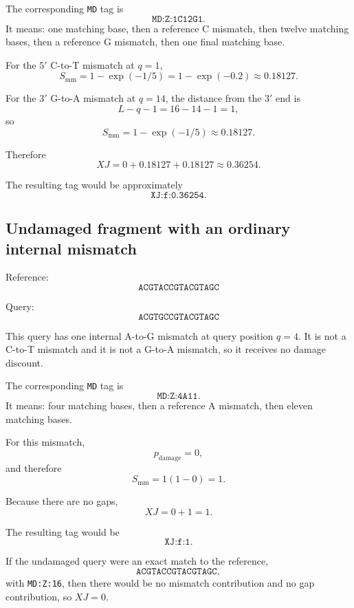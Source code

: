 \documentclass[11pt]{article}
\begin{document}
The corresponding \texttt{MD} tag is
\[
\texttt{MD:Z:1C12G1}.
\]
It means: one matching base, then a reference C mismatch, then twelve matching
bases, then a reference G mismatch, then one final matching base.

For the $5'$ C-to-T mismatch at $q=1$,
\[
S_{\mathrm{mm}} = 1 - \exp(-1/5)
               = 1 - \exp(-0.2)
               \approx 0.18127.
\]

For the $3'$ G-to-A mismatch at $q=14$, the distance from the $3'$ end is
\[
L-q-1 = 16 - 14 - 1 = 1,
\]
so
\[
S_{\mathrm{mm}} = 1 - \exp(-1/5)
               \approx 0.18127.
\]

Therefore
\[
XJ
= 0 + 0.18127 + 0.18127
\approx 0.36254.
\]

The resulting tag would be approximately
\[
\texttt{XJ:f:0.36254}.
\]

\subsection{Undamaged fragment with an ordinary internal mismatch}

Reference:
\[
\texttt{ACGTACCGTACGTAGC}
\]

Query:
\[
\texttt{ACGTGCCGTACGTAGC}
\]

This query has one internal A-to-G mismatch at query position $q=4$. It is not
a C-to-T mismatch and it is not a G-to-A mismatch, so it receives no damage
discount.

The corresponding \texttt{MD} tag is
\[
\texttt{MD:Z:4A11}.
\]
It means: four matching bases, then a reference A mismatch, then eleven
matching bases.

For this mismatch,
\[
p_{\mathrm{damage}} = 0,
\]
and therefore
\[
S_{\mathrm{mm}} = 1(1 - 0) = 1.
\]

Because there are no gaps,
\[
XJ = 0 + 1 = 1.
\]

The resulting tag would be
\[
\texttt{XJ:f:1}.
\]

If the undamaged query were an exact match to the reference,
\[
\texttt{ACGTACCGTACGTAGC},
\]
with \texttt{MD:Z:16}, then there would be no mismatch contribution and no gap
contribution, so $XJ=0$.
\end{document}
